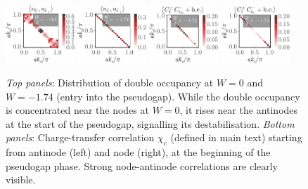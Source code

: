 \documentclass[reprint,hidelinks]{revtex4-2}
\begin{document}
\begin{figure}[!htpb]
	\centering
	\includegraphics[width=0.23\textwidth]{doubOcc-1.pdf}
	\includegraphics[width=0.23\textwidth]{doubOcc-3.pdf}
	\includegraphics[width=0.23\textwidth]{cfantinode-3.pdf}
	\includegraphics[width=0.23\textwidth]{cfnode-3.pdf}
	\caption{{\it Top panels}: Distribution of double occupancy at \(W=0\) and \(W=-1.74\) (entry into the pseudogap). While the double occupancy is concentrated near the nodes at \(W=0\), it rises near the antinodes at the start of the pseudogap, signalling its destabilisation. {\it Bottom panels}: Charge-transfer correlation \(\chi_c\) (defined in main text) starting from antinode (left) and node (right), at the beginning of the pseudogap phase. Strong node-antinode correlations are clearly visible.}
	\label{cfnode}
\end{figure}
\end{document}
